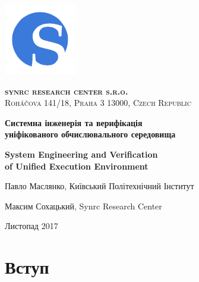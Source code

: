 \documentclass[11pt,oneside]{article}
\begin{document}
\thispagestyle{empty}
\begin{center}

\begin{minipage}[t]{2cm}
    \includegraphics[scale=0.4]{img/S}
\end{minipage}
\begin{minipage}[t]{12cm}
    \begin{flushright}
        \textsc{{\Large {\bf {\color{Blue}syn}{\color{OrangeRed}rc} research center s.r.o.}}}\\
        \textsc{Roháčova 141/18, Praha 3 13000, Czech Republic}\\
    \end{flushright}
\end{minipage}

\vspace{3cm}

    \vspace{3cm}   {\Large \bf Системна інженерія та верифікація\\ \vspace{0.2cm} уніфікованого обчислювального середовища}\par
    \vspace{1cm}   {\Large \bf System Engineering and Verification\\ \vspace{0.2cm} of Unified Execution Environment}\par
    \vspace{3cm}   {\Large Павло Маслянко, Київський Політехнічний Інститут\par}
    \vspace{0.3cm} {\Large Максим Сохацький, Synrc Research Center\par}
    \vspace{4cm}   {\Large Листопад 2017}

\end{center}

\newpage
\vspace{2cm}
\tableofcontents
\newpage
\section{Вступ}
\end{document}

